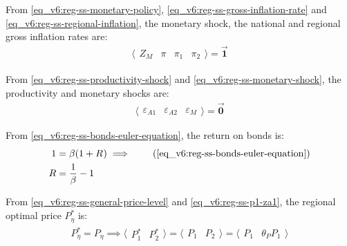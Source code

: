 \documentclass[../thesis.tex]{subfiles}
\begin{document}
	From \ref{eq_v6:reg-ss-monetary-policy}, \ref{eq_v6:reg-ss-gross-inflation-rate} and \ref{eq_v6:reg-ss-regional-inflation}, the monetary shock, the national and regional gross inflation rates are:
	\begin{align}
		\langle \begin{matrix} Z_{M} & \pi & \pi_{1} & \pi_{2} \end{matrix} \rangle  = \vec{\bm{1}} \label{eq_v6:reg-ss-zm-pi}
	\end{align}
	
	From \ref{eq_v6:reg-ss-productivity-shock} and \ref{eq_v6:reg-ss-monetary-shock}, the productivity and monetary shocks are:
	\begin{align}
		\langle \begin{matrix} \varepsilon_{A1} & \varepsilon_{A2} & \varepsilon_{M} \end{matrix} \rangle = \vec{\bm{0}} \label{eq_v6:reg-ss-epsilon}
	\end{align}
	
	From \ref{eq_v6:reg-ss-bonds-euler-equation}, the return on bonds is:
	\begin{align}
		1 &= \beta (1 + R_{}) \implies \tag{\ref{eq_v6:reg-ss-bonds-euler-equation}} \\
		R &= \frac{1}{\beta} - 1 \label{eq_v6:reg-ss-R}
	\end{align}



From \ref{eq_v6:reg-ss-general-price-level} and \ref{eq_v6:reg-ss-p1-za1}, the regional optimal price $P_{\eta}^{\ast}$ is:
\begin{align}
	P_{\eta}^{\ast} = P_{\eta} \implies \langle \begin{matrix} P_{1}^{\ast} & P_{2}^{\ast} \end{matrix} \rangle = \langle \begin{matrix} P_{1} & P_{2} \end{matrix} \rangle = \langle \begin{matrix} P_{1} & \theta_{P} P_{1} \end{matrix} \rangle \label{eq_v6:reg-ss-p1-p2}
\end{align}

\begin{comment}

Substitute \ref{eq_v6:reg-ss-p1-p2} and \ref{eq_v6:reg-ss-market-clearing-condition-Yt} in \ref{eq_v6:reg-ss-national-price-level} for the national price level:
\begin{align}
	P_{} &= \frac{P_{1} Y_{1} + P_{2} Y_{2}}{Y_{}} \tag{\ref{eq_v6:reg-ss-national-price-level}} \implies \nonumber \\
	P_{} &= \frac{P_{1} Y_{1} + \theta_{P} P_{1} Y_{2}}{Y_{}} \label{eq_v6:reg-ss-p1-p2-p}
\end{align}
	
\end{comment}
\end{document}
